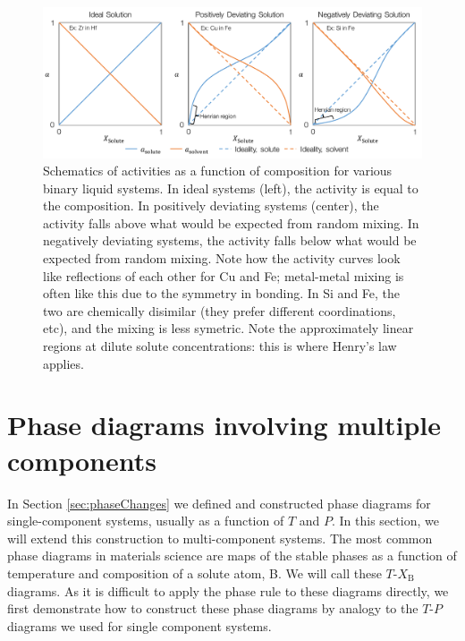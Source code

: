 \documentclass[12pt]{article}
\begin{document}
\begin{figure}[h]
\centering
\includegraphics[width=\textwidth]{activities_with_composition}
\caption{Schematics of activities as a function of composition for various binary liquid systems. In ideal systems (left), the activity is equal to the composition. In positively deviating systems (center), the activity falls above what would be expected from random mixing. In negatively deviating systems, the activity falls below what would be expected from random mixing. Note how the activity curves look like reflections of each other for Cu and Fe; metal-metal mixing is often like this due to the symmetry in bonding. In Si and Fe, the two are chemically disimilar (they prefer different coordinations, etc), and the mixing is less symetric. Note the approximately linear regions at dilute solute concentrations: this is where Henry's law applies.}
\label{activityComposition}
\end{figure}

\section{Phase diagrams involving multiple components}
In Section \ref{sec:phaseChanges} we defined and constructed phase diagrams for single-component systems, usually as a function of $T$ and $P$. In this section, we will extend this construction to multi-component systems. The most common phase diagrams in materials science are maps of the stable phases as a function of temperature and composition of a solute atom, B. We will call these $T$-$X_\text{B}$ diagrams. As it is difficult to apply the phase rule to these diagrams directly, we first demonstrate how to construct these phase diagrams by analogy to the $T$-$P$ diagrams we used for single component systems. 
\end{document}
